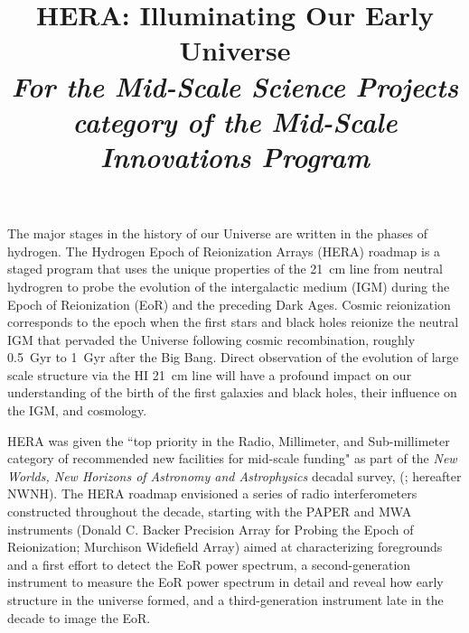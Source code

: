 \documentclass[preprint]{aastex}
\def\HI{{H{\small I }}}
\begin{document}
\title{HERA: Illuminating Our Early Universe\\
{\it For the Mid-Scale Science Projects category of the Mid-Scale Innovations Program}} 



{ \setlength{\parindent}{0cm}
The major stages in the history of our Universe are written in the phases of
hydrogen. The Hydrogen Epoch of Reionization Arrays (HERA) roadmap is a staged
program that uses the unique properties of the 21~cm line from neutral
hydrogren to probe the evolution of the intergalactic medium (IGM) during the
Epoch of Reionization (EoR) and the preceding Dark Ages. Cosmic reionization
corresponds to the epoch when the first stars and black holes reionize the
neutral IGM that pervaded the Universe following cosmic recombination, roughly
0.5~Gyr to 1~Gyr after the Big Bang. Direct observation of the evolution of
large scale structure via the \HI 21~cm line will have a profound impact on our
understanding of the birth of the first galaxies and black holes, their
influence on the IGM, and cosmology.}  

HERA was given the ``top priority in the Radio, Millimeter, and Sub-millimeter
category of recommended new facilities for mid-scale funding" as part of the
{\it New Worlds, New Horizons of Astronomy and Astrophysics} decadal survey,
(\citealt{astro2010}; hereafter NWNH).  
The HERA roadmap envisioned a series of
radio interferometers constructed throughout the decade, starting with the
PAPER and MWA instruments (Donald C. Backer Precision Array for Probing the
Epoch of Reionization; Murchison Widefield Array) aimed at characterizing
foregrounds and a first effort to detect the EoR power
spectrum, a second-generation instrument to measure the EoR power spectrum in
detail and reveal how early structure in the universe formed, and a
third-generation instrument late in the decade to image the EoR. 
\end{document}
